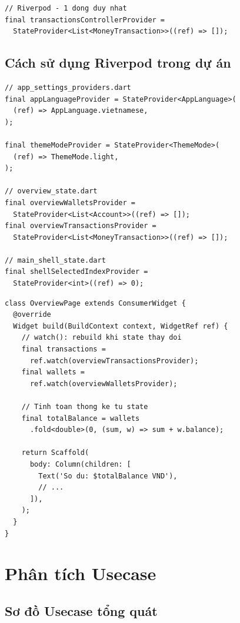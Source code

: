 \begin{lstlisting}[caption={Riverpod: chỉ cần 1 dòng provider}]
// Riverpod - 1 dong duy nhat
final transactionsControllerProvider =
  StateProvider<List<MoneyTransaction>>((ref) => []);
\end{lstlisting}

\subsection{Cách sử dụng Riverpod trong dự án}

\begin{lstlisting}[caption={Riverpod trong G13 Money --- Provider declarations}]
// app_settings_providers.dart
final appLanguageProvider = StateProvider<AppLanguage>(
  (ref) => AppLanguage.vietnamese,
);

final themeModeProvider = StateProvider<ThemeMode>(
  (ref) => ThemeMode.light,
);

// overview_state.dart
final overviewWalletsProvider =
  StateProvider<List<Account>>((ref) => []);
final overviewTransactionsProvider =
  StateProvider<List<MoneyTransaction>>((ref) => []);

// main_shell_state.dart
final shellSelectedIndexProvider =
  StateProvider<int>((ref) => 0);
\end{lstlisting}

\begin{lstlisting}[caption={Đọc và cập nhật state trong Widget}]
class OverviewPage extends ConsumerWidget {
  @override
  Widget build(BuildContext context, WidgetRef ref) {
    // watch(): rebuild khi state thay doi
    final transactions =
      ref.watch(overviewTransactionsProvider);
    final wallets =
      ref.watch(overviewWalletsProvider);

    // Tinh toan thong ke tu state
    final totalBalance = wallets
      .fold<double>(0, (sum, w) => sum + w.balance);
    
    return Scaffold(
      body: Column(children: [
        Text('So du: $totalBalance VND'),
        // ...
      ]),
    );
  }
}
\end{lstlisting}

\section{Phân tích Usecase}

\subsection{Sơ đồ Usecase tổng quát}

